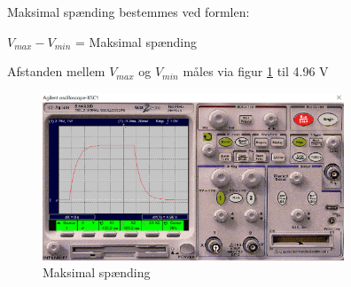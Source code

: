 Maksimal spænding bestemmes ved formlen:
\begin{center}
$V_{max} - V_{min}$ = Maksimal spænding
\end{center}


Afstanden mellem $V_{max}$ og $V_{min}$ måles via figur \ref{100k.5Hz.min.max} til 4.96 V

\begin{figure}[h]
 \begin{center}
  \includegraphics[height=5cm]{P_Fig/figur5_100k_5Hz_min_max.png}
  \caption{Maksimal spænding}
  \label{100k.5Hz.min.max}
 \end{center}
\end{figure}
